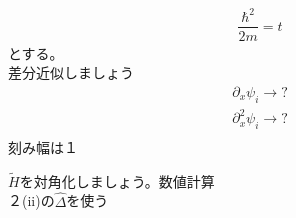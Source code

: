 \documentclass{jarticle}
\begin{document}
\begin{align}
\dfrac{\hbar^2}{2m}=t
\end{align}
とする。\\
差分近似しましょう\\
\begin{align}
\partial_x \psi_i\rightarrow?\\
\partial^2_x \psi_i\rightarrow?\\
\end{align}
刻み幅は$１$


$\tilde{H}$を対角化しましょう。数値計算\\
２(ii)の$\hat{\Delta}$を使う\\
\end{document}
